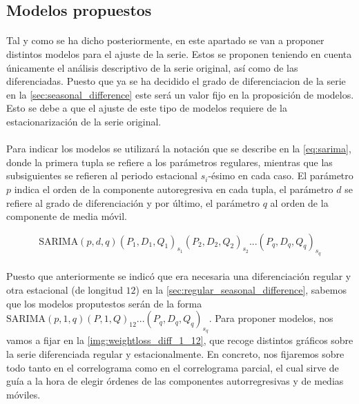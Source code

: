 \documentclass[a4paper, spanish]{article}
\begin{document}
    \subsection{Modelos propuestos}
    \label{sec:proposed_models}

      \paragraph{}
      Tal y como se ha dicho posteriormente, en este apartado se van a proponer distintos modelos para el ajuste de la serie. Estos se proponen teniendo en cuenta únicamente el análisis descriptivo de la serie original, así como de las diferenciadas. Puesto que ya se ha decidido el grado de diferenciacion de la serie en la \autoref{sec:seasonal_difference} este será un valor fijo en la proposición de modelos. Esto se debe a que el ajuste de este tipo de modelos requiere de la estacionarización de la serie original.

      \paragraph{}
      Para indicar los modelos se utilizará la notación que se describe en la \autoref{eq:sarima}, donde la primera tupla se refiere a los parámetros regulares, mientras que las subsiguientes se refieren al periodo estacional $s_i$-ésimo en cada caso. El parámetro $p$ indica el orden de la componente autoregresiva en cada tupla, el parámetro $d$ se refiere al grado de diferenciación y por último, el parámetro $q$ al orden de la componente de media móvil.

      \begin{equation}
      \label{eq:sarima}
        \text{SARIMA}(p, d, q)(P_1, D_1, Q_1)_{s_1}(P_2, D_2, Q_2)_{s_2}...(P_q, D_q, Q_q)_{s_q}
      \end{equation}

      \paragraph{}
      Puesto que anteriormente se indicó que era necesaria una diferenciación regular y otra estacional (de longitud $12$) en la \autoref{sec:regular_seasonal_difference}, sabemos que los modelos proputestos serán de la forma $\text{SARIMA}(p, 1, q)(P, 1, Q)_{12}...(P_q, D_q, Q_q)_{s_q}$. Para proponer modelos, nos vamos a fijar en la \autoref{img:weightloss_diff_1_12}, que recoge distintos gráficos sobre la serie diferenciada regular y estacionalmente. En concreto, nos fijaremos sobre todo tanto en el correlograma como en el correlograma parcial, el cual sirve de guía a la hora de elegir órdenes de las componentes autorregresivas y de medias móviles.
\end{document}
